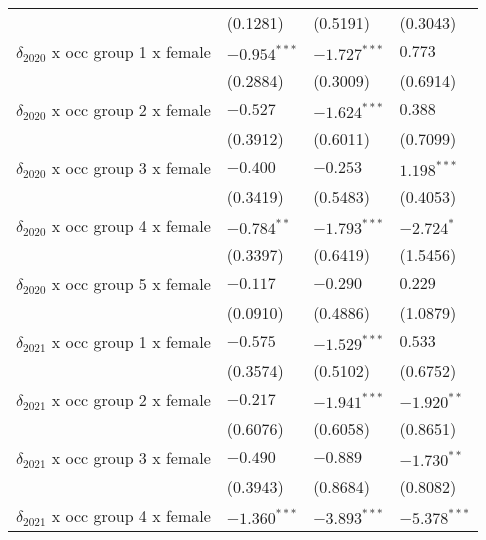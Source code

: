 \begin{tabular}{llll}
                                         &           (0.1281) &           (0.5191) &           (0.3043) \\
$\delta_{2020}$ x occ group 1 x female   &     $-0.954^{***}$ &     $-1.727^{***}$ &            $0.773$ \\
                                         &           (0.2884) &           (0.3009) &           (0.6914) \\
$\delta_{2020}$ x occ group 2 x female   &           $-0.527$ &     $-1.624^{***}$ &            $0.388$ \\
                                         &           (0.3912) &           (0.6011) &           (0.7099) \\
$\delta_{2020}$ x occ group 3 x female   &           $-0.400$ &           $-0.253$ &      $1.198^{***}$ \\
                                         &           (0.3419) &           (0.5483) &           (0.4053) \\
$\delta_{2020}$ x occ group 4 x female   &      $-0.784^{**}$ &     $-1.793^{***}$ &         $-2.724^*$ \\
                                         &           (0.3397) &           (0.6419) &           (1.5456) \\
$\delta_{2020}$ x occ group 5 x female   &           $-0.117$ &           $-0.290$ &            $0.229$ \\
                                         &           (0.0910) &           (0.4886) &           (1.0879) \\
$\delta_{2021}$ x occ group 1 x female   &           $-0.575$ &     $-1.529^{***}$ &            $0.533$ \\
                                         &           (0.3574) &           (0.5102) &           (0.6752) \\
$\delta_{2021}$ x occ group 2 x female   &           $-0.217$ &     $-1.941^{***}$ &      $-1.920^{**}$ \\
                                         &           (0.6076) &           (0.6058) &           (0.8651) \\
$\delta_{2021}$ x occ group 3 x female   &           $-0.490$ &           $-0.889$ &      $-1.730^{**}$ \\
                                         &           (0.3943) &           (0.8684) &           (0.8082) \\
$\delta_{2021}$ x occ group 4 x female   &     $-1.360^{***}$ &     $-3.893^{***}$ &     $-5.378^{***}$ \\

\end{tabular}
